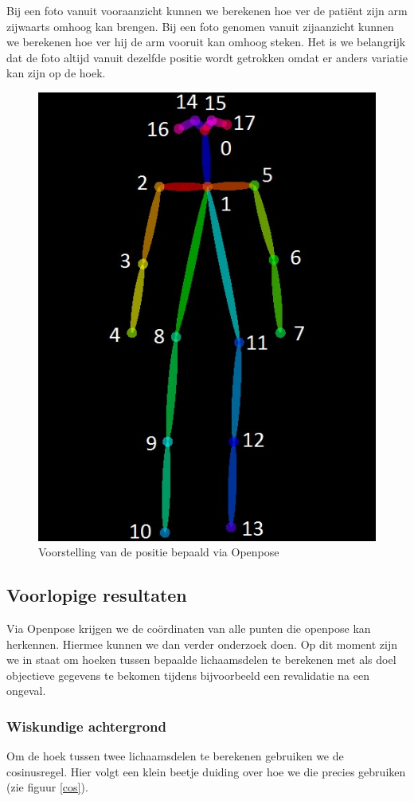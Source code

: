 \documentclass{article}
\begin{document}
Bij een foto vanuit vooraanzicht kunnen we berekenen hoe ver de patiënt zijn arm zijwaarts omhoog kan brengen. Bij een foto genomen vanuit zijaanzicht kunnen we berekenen hoe ver hij de arm vooruit kan omhoog steken. Het is we belangrijk dat de foto altijd vanuit dezelfde positie wordt getrokken omdat er anders variatie kan zijn op de hoek.



\begin{figure}[H]
	\centering
	\caption{Voorstelling van de positie bepaald via Openpose}
	\label{fig:skelet}
	\includegraphics[width=.5\textwidth]{HPE_skelet}
\end{figure}


	\subsection{Voorlopige resultaten}

Via Openpose krijgen we de coördinaten van alle punten die openpose kan herkennen. Hiermee kunnen we dan verder onderzoek doen. Op dit moment zijn we in staat om hoeken tussen bepaalde lichaamsdelen te berekenen met als doel objectieve gegevens te bekomen tijdens bijvoorbeeld een revalidatie na een ongeval.

\subsubsection{Wiskundige achtergrond}
Om de hoek tussen twee lichaamsdelen te berekenen gebruiken we de cosinusregel. Hier volgt een klein beetje duiding over hoe we die precies gebruiken (zie figuur \ref{cos}).\\
\end{document}
